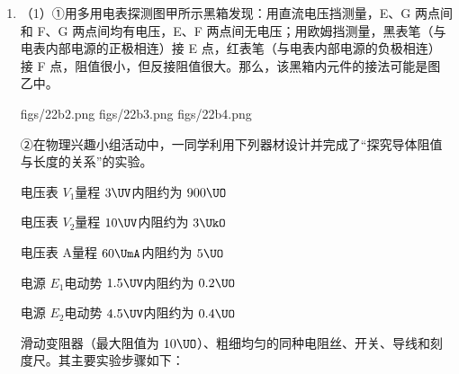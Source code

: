 \documentclass[\gkver]{gaokaozhenti}
\begin{document}
\begin{enumerate}

{滑块从位置 1 到 2 的过程中，电场力做的功比从位置 3 到 4 的小}
{在 M、N 之间的范围内，可能存在滑块速度相同的两个位置}
{在 M、N 之间可能存在只由电场力确定滑块加速度大小的三个位置}


\item
（1）①用多用电表探测图甲所示黑箱发现：用直流电压挡测量，E、G 两点间和 F、G 两点间均有电压，E、F 两点间无电压；用欧姆挡测量，黑表笔（与电表内部电源的正极相连）接 E 点，红表笔（与电表内部电源的负极相连）接 F 点，阻值很小，但反接阻值很大。那么，该黑箱内元件的接法可能是图乙中。


{figs/22b2.png}
{figs/22b3.png}
{figs/22b4.png}

②在物理兴趣小组活动中，一同学利用下列器材设计并完成了“探究导体阻值与长度的关系”的实验。

电压表 $V_{1}$\quad 量程 $3\UV$\quad 内阻约为 $900\UO$

电压表 $V_{2}$\quad 量程 $10\UV$\quad 内阻约为 $3\UkO$

电压表 A\quad 量程 $60\UmA$\quad 内阻约为 $5\UO$

电源 $E_{1}$\quad 电动势 $1.5\UV$\quad 内阻约为 $0.2\UO$

电源 $E_{2}$\quad 电动势 $4.5\UV$\quad 内阻约为 $0.4\UO$

滑动变阻器（最大阻值为 $10\UO$）、粗细均匀的同种电阻丝、开关、导线和刻度尺。其主要实验步骤如下：



\end{enumerate}
\end{document}
